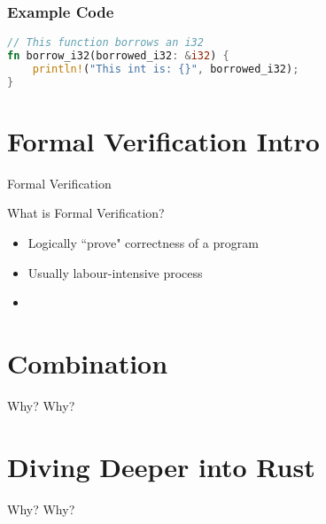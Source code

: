 \documentclass{beamer}
\begin{document}
\begin{frame}[fragile]
\frametitle{Example Code}
\begin{lstlisting}[language=Rust]
// This function borrows an i32
fn borrow_i32(borrowed_i32: &i32) {
    println!("This int is: {}", borrowed_i32);
}
\end{lstlisting}
\end{frame}



\section{Formal Verification Intro}
\begin{frame}{Formal Verification}
\begin{block}{What is Formal Verification?}
\begin{itemize} 
	\item Logically ``prove" correctness of a program
	\item Usually labour-intensive process
	\item 
\end{itemize} 
\end{block}
\end{frame}


\section{Combination}
\begin{frame}{Why?}
Why? 
\end{frame}

\section{Diving Deeper into Rust}
\begin{frame}{Why?}
Why? 
\end{frame}
\end{document}
